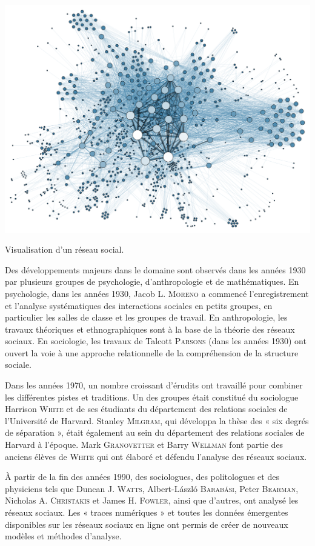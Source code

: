 \begin{margingraphic}
\Centering
\includegraphics[width=\linewidth]{./Images/Chapter09/social-network-analysis-visualization.png}
\caption{Visualisation d'un réseau social.}
\end{margingraphic}

Des développements majeurs dans le domaine sont observés dans les années 1930 par plusieurs groupes de psychologie, d'anthropologie et de mathématiques. En psychologie, dans les années 1930, Jacob L. \textsc{Moreno} a commencé l’enregistrement et l’analyse systématiques des interactions sociales en petits groupes, en particulier les salles de classe et les groupes de travail. En anthropologie, les travaux théoriques et ethnographiques sont à la base de la théorie des réseaux sociaux.  En sociologie, les travaux de Talcott \textsc{Parsons} (dans les années 1930) ont ouvert la voie à une approche relationnelle de la compréhension de la structure sociale.

Dans les années 1970, un nombre croissant d'érudits ont travaillé pour combiner les différentes pistes et traditions. Un des groupes était constitué du sociologue Harrison \textsc{White} et de ses étudiants du département des relations sociales de l’Université de Harvard. Stanley \textsc{Milgram}, qui développa la thèse des « six degrés de séparation », était également au sein du département des relations sociales de Harvard à l'époque. Mark \textsc{Granovetter} et Barry \textsc{Wellman} font partie des anciens élèves de \textsc{White} qui ont élaboré et défendu l'analyse des réseaux sociaux.

À partir de la fin des années 1990, des sociologues, des politologues et des physiciens tels que Duncan J. \textsc{Watts}, Albert-László \textsc{Barabási}, Peter \textsc{Bearman}, Nicholas A. \textsc{Christakis} et James H. \textsc{Fowler}, ainsi que d’autres, ont analysé les réseaux sociaux. Les « traces numériques » et toutes les données émergentes disponibles sur les réseaux sociaux en ligne ont permis de créer de nouveaux modèles et méthodes d'analyse.

